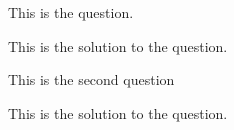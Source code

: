 \documentclass[answers]{exam}
\begin{document}

\begin{questions}
\question
    This is the question.

\begin{solution}
    This is the solution to the question.
\end{solution}


\question

This is the second question

\begin{solution}
    This is the solution to the question.
\end{solution}

\end{questions}
\end{document}
